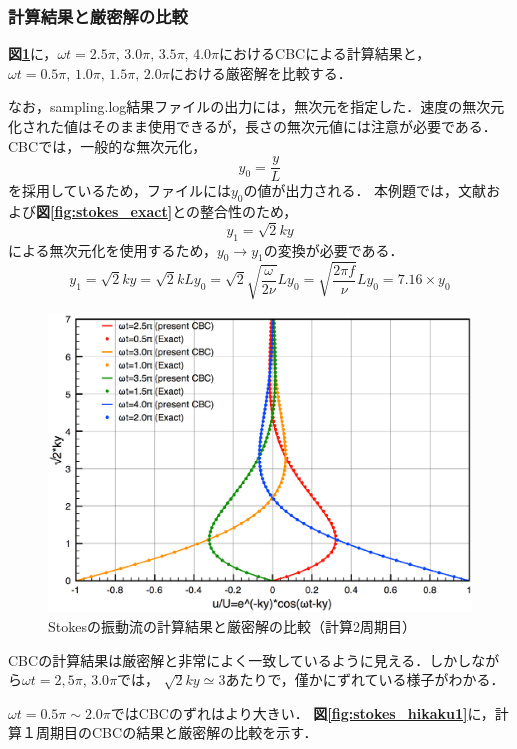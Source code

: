 \subsubsection{計算結果と厳密解の比較}
\textbf{図\ref{fig:stokes_hikaku}}に，$\omega t=2.5\pi, \, 3.0\pi, \, 3.5\pi, \, 4.0\pi$におけるCBCによる計算結果と，$\omega t=0.5\pi, \, 1.0\pi, \, 1.5\pi, \, 2.0\pi$における厳密解を比較する．

なお，sampling.log結果ファイルの出力には，無次元を指定した．速度の無次元化された値はそのまま使用できるが，長さの無次元値には注意が必要である．CBCでは，一般的な無次元化，
\[
y_0=\frac{y}{L}
\]
を採用しているため，ファイルには$y_0$の値が出力される．
本例題では，文献\cite{hino:74:fd}および\textbf{図\ref{fig:stokes_exact}}との整合性のため，
\[
y_1=\sqrt{2}ky
\]
による無次元化を使用するため，$y_0\rightarrow y_1$の変換が必要である．
\[
y_1=\sqrt{2}ky=\sqrt{2}kLy_0=\sqrt{2}\sqrt{\frac{\omega}{2\nu}}Ly_0=\sqrt{\frac{2\pi f}{\nu}}Ly_0=7.16\times y_0
\]

\begin{figure}[htbp]
\begin{center}
\includegraphics[width=14cm]{13stokes.eps}
\end{center}
\caption{Stokesの振動流の計算結果と厳密解の比較（計算2周期目）}
\label{fig:stokes_hikaku}
\end{figure}

CBCの計算結果は厳密解と非常によく一致しているように見える．しかしながら$\omega t=2,5\pi, \, 3.0\pi$では，
$\sqrt{2}ky\simeq 3$あたりで，僅かにずれている様子がわかる．

$\omega t=0.5\pi \sim 2.0\pi$ではCBCのずれはより大きい．
\textbf{図\ref{fig:stokes_hikaku1}}に，計算１周期目のCBCの結果と厳密解の比較を示す．

